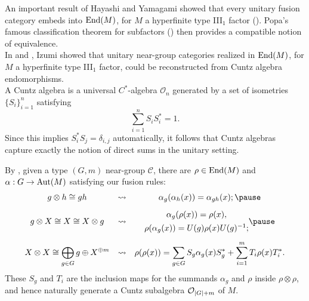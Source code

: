 \documentclass{beamer}
\DeclarePairedDelimiter{\abs}{\lvert}{\rvert}
\begin{document}


\begin{frame}
An important result of Hayashi and Yamagami showed that \textcolor{structure}{every unitary fusion category} embeds into $\textup{End}(M)$, for $M$ a hyperfinite type III$_1$ factor (\cite{HY00}). Popa's famous classification theorem for subfactors (\cite{Pop95}) then provides a compatible notion of equivalence.\pause\\[2ex]

In \cite{Izu93} and \cite{Izu01}, Izumi showed that unitary near-group categories realized in $\textup{End}(M)$, for $M$ a hyperfinite type III$_1$ factor, could be reconstructed from \textcolor{structure}{Cuntz algebra endomorphisms}.\pause\\[2ex]

A \textcolor{structure}{Cuntz algebra} is a universal $C^*$-algebra $\mathcal{O}_n$ generated by a set of isometries $\{S_i\}_{i=1}^n$ satisfying
\[
\sum_{i=1}^n S_iS_i^* = 1.
\]
Since this implies $S_i^*S_j = \delta_{i,j}$ automatically, it follows that Cuntz algebras capture exactly the notion of \textcolor{structure}{direct sums} in the unitary setting.\\[2ex]
\end{frame}

\begin{frame}
By \cite{HY00}, given a \textcolor{structure}{type $(G, m)$ near-group} $\mathcal{C}$, there are $\rho \in \textup{End}(M)$ and $\alpha : G \to \textup{Aut}(M)$ satisfying our fusion rules:\pause
\[\begin{array}{ccc}
g \otimes h \cong gh&\rightsquigarrow&\alpha_g(\alpha_h(x)) = \alpha_{gh}(x);\pause\\[2ex]
g \otimes X \cong X \cong X \otimes g&\rightsquigarrow&\begin{matrix*}[c]\alpha_g(\rho(x)) = \rho(x),\\[1ex]\rho(\alpha_g(x)) = U(g)\rho(x)U(g)^{-1};\end{matrix*}\pause\\[4ex]
\displaystyle X \otimes X \cong \bigoplus_{g \in G}g \oplus X^{\oplus m}&\rightsquigarrow&\rho(\rho(x)) = \displaystyle\sum_{g \in G}{S_g\alpha_g(x)S_g^*} + \sum_{i=1}^m{T_i\rho(x)T_i^*}.
\end{array}\]
These $S_g$ and $T_i$ are the inclusion maps for the summands $\alpha_g$ and $\rho$ inside $\rho \otimes \rho$, and hence naturally generate a Cuntz subalgebra $\mathcal{O}_{\abs{G}+m}$ of $M$.
\end{frame}
\end{document}
